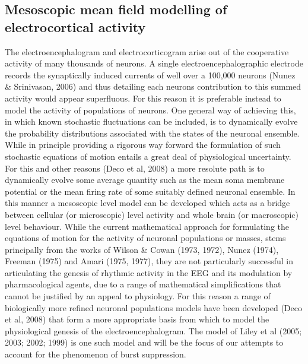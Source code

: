 \documentclass[a4paper,12pt]{article}
\begin{document}
\subsection{Mesoscopic mean field modelling of electrocortical activity}
The electroencephalogram and electrocorticogram arise out of the
cooperative activity of many thousands of neurons. A single
electroencephalographic electrode records the synaptically induced
currents of well over a 100,000 neurons (Nunez \& Srinivasan, 2006)
and thus detailing each neurons contribution to this summed activity
would appear superfluous. For this reason it is preferable instead to
model the activity of populations of neurons. One general way of
achieving this, in which known stochastic fluctuations can be included,
is to dynamically evolve the probability distributions associated with
the states of the neuronal ensemble. While in principle providing a
rigorous way forward the formulation of such stochastic equations of
motion entails a great deal of physiological uncertainty. For this and
other reasons (Deco et al, 2008) a more resolute path is to
dynamically evolve some average quantity such as the mean soma
membrane potential or the mean firing rate of some suitably defined
neuronal ensemble. In this manner a mesoscopic level model can be
developed which acts as a bridge between cellular (or microscopic)
level activity and whole brain (or macroscopic) level behaviour.
While the current mathematical approach for formulating the equations
of motion for the activity of neuronal populations or masses, stems
principally from the works of Wilson \& Cowan (1973, 1972), Nunez
(1974), Freeman (1975) and Amari (1975, 1977), they are not
particularly successful in articulating the genesis of rhythmic activity in
the EEG and its modulation by pharmacological agents, due to a range
of mathematical simplifications that cannot be justified by an appeal to
physiology. For this reason a range of biologically more refined
neuronal populations models have been developed (Deco et al, 2008)
that form a more appropriate basis from which to model the
physiological genesis of the electroencephalogram. The model of Liley
et al (2005; 2003; 2002; 1999) is one such model and will be the
focus of our attempts to account for the phenomenon of burst
suppression.
\end{document}
